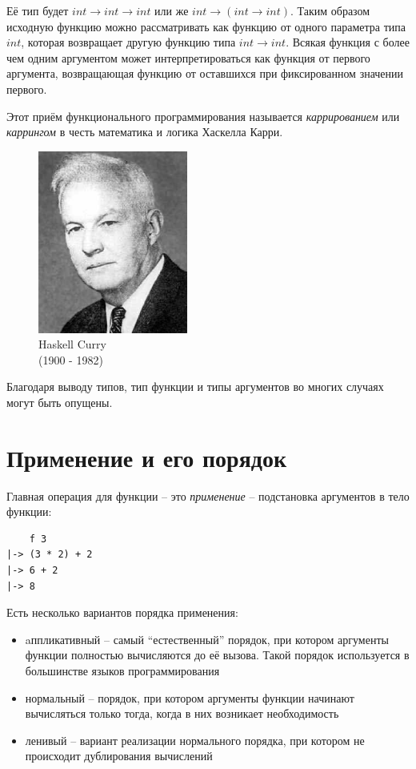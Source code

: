 \documentclass[a4paper,11pt]{article}
\begin{document}
Её тип будет $int \rightarrow int \rightarrow int$ или же $int \rightarrow (int 
\rightarrow int)$. Таким образом исходную функцию можно рассматривать как
функцию от одного параметра типа $int$, которая возвращает другую функцию
типа $int \rightarrow int$. Всякая функция с более чем одним аргументом 
может интерпретироваться как функция от первого аргумента, возвращающая функцию
от оставшихся при фиксированном значении первого. 

Этот приём функционального программирования называется \emph{каррированием} или
\emph{каррингом} в честь математика и логика Хаскелла Карри.

\begin{figure}[h]
    \begin{center}
        \includegraphics[height=60mm]{lecture1/curry.eps}
        \caption{Haskell Curry\\(1900 - 1982)}
    \end{center}
\end{figure}

Благодаря выводу типов, тип функции и типы аргументов во многих случаях могут
быть опущены.

\section{Применение и его порядок}

Главная операция для функции -- это \emph{применение} -- подстановка аргументов
в тело функции:
\begin{lstlisting}
    f 3
|-> (3 * 2) + 2
|-> 6 + 2
|-> 8
\end{lstlisting}

Есть несколько вариантов порядка применения:
\begin{itemize}
\item aппликативный -- самый ``естественный'' порядок, при котором аргументы
функции полностью вычисляются до её вызова. Такой порядок используется в
большинстве языков программирования
\item нормальный -- порядок, при котором аргументы функции начинают вычисляться
только тогда, когда в них возникает необходимость
\item ленивый -- вариант реализации нормального порядка, при котором не
происходит дублирования вычислений
\end{itemize}
\end{document}
